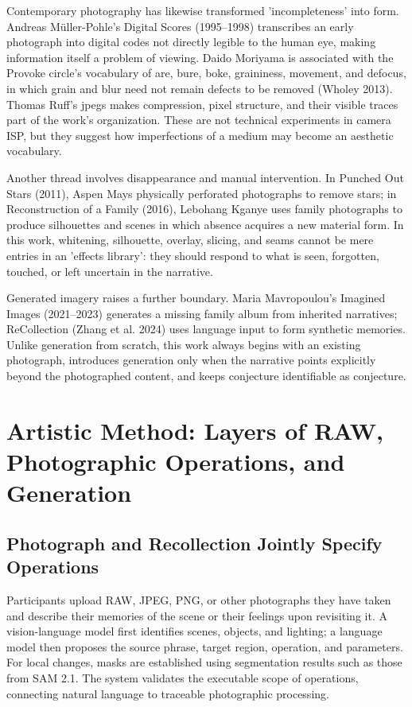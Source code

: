 \documentclass[manuscript,review,anonymous,authoryear]{acmart}
\begin{document}
Contemporary photography has likewise transformed 'incompleteness' into form. Andreas Müller-Pohle's Digital Scores (1995--1998) transcribes an early photograph into digital codes not directly legible to the human eye, making information itself a problem of viewing. Daido Moriyama is associated with the Provoke circle's vocabulary of are, bure, boke, graininess, movement, and defocus, in which grain and blur need not remain defects to be removed (Wholey 2013). Thomas Ruff's jpegs makes compression, pixel structure, and their visible traces part of the work's organization. These are not technical experiments in camera ISP, but they suggest how imperfections of a medium may become an aesthetic vocabulary.


Another thread involves disappearance and manual intervention. In Punched Out Stars (2011), Aspen Mays physically perforated photographs to remove stars; in Reconstruction of a Family (2016), Lebohang Kganye uses family photographs to produce silhouettes and scenes in which absence acquires a new material form. In this work, whitening, silhouette, overlay, slicing, and seams cannot be mere entries in an 'effects library': they should respond to what is seen, forgotten, touched, or left uncertain in the narrative.


Generated imagery raises a further boundary. Maria Mavropoulou's Imagined Images (2021--2023) generates a missing family album from inherited narratives; ReCollection (Zhang et al. 2024) uses language input to form synthetic memories. Unlike generation from scratch, this work always begins with an existing photograph, introduces generation only when the narrative points explicitly beyond the photographed content, and keeps conjecture identifiable as conjecture.


\section{Artistic Method: Layers of RAW, Photographic Operations, and Generation}

\subsection{Photograph and Recollection Jointly Specify Operations}

Participants upload RAW, JPEG, PNG, or other photographs they have taken and describe their memories of the scene or their feelings upon revisiting it. A vision-language model first identifies scenes, objects, and lighting; a language model then proposes the source phrase, target region, operation, and parameters. For local changes, masks are established using segmentation results such as those from SAM 2.1. The system validates the executable scope of operations, connecting natural language to traceable photographic processing.
\end{document}
